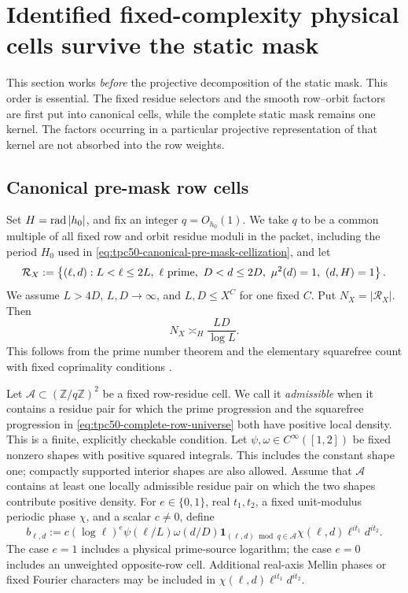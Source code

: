 \section{Identified fixed-complexity physical cells survive the static mask}
\label{sec:tpc50-physical-cell-survival}

This section works \emph{before} the projective decomposition of the
static mask.  This order is essential.  The fixed residue selectors and
the smooth row--orbit factors are first put into canonical cells, while
the complete static mask remains one kernel.  The factors occurring in
a particular projective representation of that kernel are not absorbed
into the row weights.

\subsection{Canonical pre-mask row cells}

Set \(H=\operatorname{rad}|h_0|\), and fix an integer \(q=O_{h_0}(1)\).  We take \(q\) to be a
common multiple of all fixed row and orbit residue moduli in the packet,
including the period \(H_0\) used in
\eqref{eq:tpc50-canonical-pre-mask-cellization}, and let
\begin{equation}
 \mathcal R_X
 :=\left\{(\ell,d):
 L<\ell\leq2L,\ \ell\ {\rm prime},\
 D<d\leq2D,\ \mu^2(d)=1,\ (d,H)=1
 \right\}.
 \label{eq:tpc50-complete-row-universe}
\end{equation}
We assume \(L>4D\), \(L,D\to\infty\), and \(L,D\leq X^C\) for one
fixed \(C\).  Put \(N_X=|\mathcal R_X|\).  Then
\begin{equation}
 N_X\asymp_H\frac{LD}{\log L}.
 \label{eq:tpc50-complete-row-count}
\end{equation}
This follows from the prime number theorem and the elementary
squarefree count with fixed coprimality conditions
\citep{IwaniecKowalski2004}.

Let \(\mathcal A\subset(\mathbb Z/q\mathbb Z)^2\) be a fixed row-residue
cell.  We call it \emph{admissible} when it contains a residue pair for
which the prime progression and the squarefree progression in
\eqref{eq:tpc50-complete-row-universe} both have positive local density.
This is a finite, explicitly checkable condition.  Let
\(\psi,\omega\in C^\infty([1,2])\) be fixed nonzero shapes with
positive squared integrals.  This includes the constant shape one;
compactly supported interior shapes are also allowed.  Assume that
\(\mathcal A\) contains at least one locally admissible residue pair on
which the two shapes contribute positive density.  For
\(e\in\{0,1\}\), real \(t_1,t_2\), a fixed unit-modulus
periodic phase \(\chi\), and a scalar \(c\neq0\), define
\begin{equation}
 b_{\ell,d}
 :=c(\log\ell)^e\psi(\ell/L)\omega(d/D)
 \mathbf 1_{(\ell,d)\bmod q\in\mathcal A}
 \chi(\ell,d)\ell^{it_1}d^{it_2}.
 \label{eq:tpc50-canonical-cell-weight}
\end{equation}
The case \(e=1\) includes a physical prime-source logarithm; the case
\(e=0\) includes an unweighted opposite-row cell.  Additional
real-axis Mellin phases or fixed Fourier characters may be included in
\(\chi(\ell,d)\ell^{it_1}d^{it_2}\).


